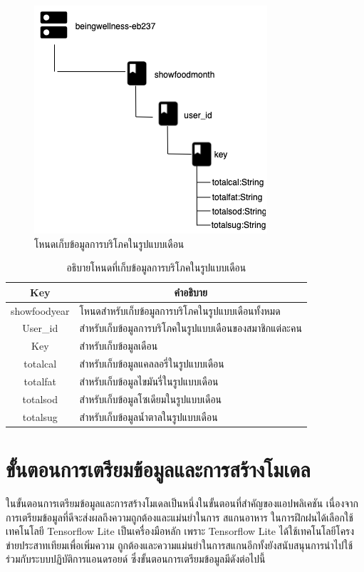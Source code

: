 \newpage
\begin{figure}[H]
	\centering
	\includegraphics[width=0.6\columnwidth]
	{Figures/3/DB/showfoodmonth.png}
	\caption{โหนดเก็บข้อมูลการบริโภคในรูปแบบเดือน}
	\label{Fig:DB4}
\end{figure}
\begin{table}[H]
	\centering
	\caption{อธิบายโหนดที่เก็บข้อมูลการบริโภคในรูปแบบเดือน}
	\label{my-label1}
	\begin{tabular}{|c|p{10cm}|}
		\hline
		\multicolumn{1}{|c|}{\textbf{Key}} & \multicolumn{1}{c|}{\textbf{คำอธิบาย}} \\ \hline
		showfoodyear & โหนดสำหรับเก็บข้อมูลการบริโภคในรูปแบบเดือนทั้งหมด\\ \hline
		User\_id &  สำหรับเก็บข้อมูลการบริโภคในรูปแบบเดือนของสมาชิกแต่ละคน \\ \hline
		Key & สำหรับเก็บข้อมูลเดือน\\ \hline
		totalcal & สำหรับเก็บข้อมูลแคลลอรี่ในรูปแบบเดือน \\ \hline
		totalfat & สำหรับเก็บข้อมูลไขมันรี่ในรูปแบบเดือน \\ \hline
		totalsod & สำหรับเก็บข้อมูลโซเดียมในรูปแบบเดือน\\ \hline
		totalsug & สำหรับเก็บข้อมูลน้ำตาลในรูปแบบเดือน\\ \hline
	\end{tabular}
\end{table}
\newpage
	
\section{ขั้นตอนการเตรียมข้อมูลและการสร้างโมเดล}
ในขั้นตอนการเตรียมข้อมูลและการสร้างโมเดลเป็นหนึ่งในขั้นตอนที่สำคัญของแอปพลิเคชัน เนื่องจากการเตรียมข้อมูลที่ดีจะส่งผลถึงความถูกต้องและแม่นยำในการ
สแกนอาหาร ในการฝึกฝนได้เลือกใช้เทคโนโลยี Tensorflow Lite เป็นเครื่องมือหลัก เพราะ Tensorflow Lite ได้ใช้เทคโนโลยีโครงข่ายประสาทเทียมเพื่อเพิ่มความ
ถูกต้องและความแม่นยำในการสแกนอีกทั้งยังสนับสนุนการนำไปใช้ร่วมกับระบบปฏิบัติการแอนดรอยด์ ซึ่งขั้นตอนการเตรียมข้อมูลมีดังต่อไปนี้  

